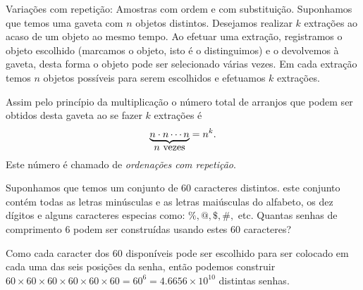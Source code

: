 \begin{frame}{Variações com repetição: Amostras com ordem e com substituição.} Suponhamos que temos uma gaveta com $n$  objetos distintos. Desejamos realizar $k$ extrações ao acaso de um objeto ao mesmo tempo. Ao efetuar uma extração, registramos o objeto escolhido (marcamos o objeto, isto é o distinguimos) e o devolvemos à gaveta, desta forma o objeto pode ser selecionado várias vezes. Em cada extração temos $n$ objetos possíveis para serem escolhidos e efetuamos $k$ extrações. 

Assim pelo princípio da multiplicação o número total de arranjos que podem ser obtidos desta gaveta ao se fazer $k$ extrações é 
$$\displaystyle{\underbrace{n\cdot n\cdots n}_{\text{\normalsize $n$ vezes}}=n^k.}$$ 
Este número é chamado de {\it ordenações com repetição}. 

\begin{exem}
Suponhamos que temos um conjunto de 60 caracteres distintos. este conjunto contém todas as letras minúsculas e as letras maiúsculas do alfabeto, os dez dígitos e alguns caracteres especias como: $\%, @, \$, \#,$ etc. Quantas senhas de comprimento 6 podem ser construídas usando estes 60 caracteres?

Como cada caracter dos 60 disponíveis pode ser escolhido para ser colocado em cada uma das seis posições da senha, então podemos construir $60 \times 60 \times 60 \times 60 \times 60 \times 60= 60^6 =4.6656\times 10^{10} $ distintas senhas.
\end{exem}

 
\end{frame}

